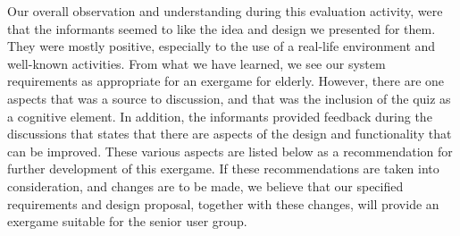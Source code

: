 Our overall observation and understanding during this evaluation activity, were that the informants seemed to like the idea and design we presented for them. They were mostly positive, especially to the use of a real-life environment and well-known activities. From what we have learned, we see our system requirements as appropriate for an exergame for elderly. However, there are one aspects that was a source to discussion, and that was the inclusion of the quiz as a cognitive element. In addition, the informants provided feedback during the discussions that states that there are aspects of the design and functionality that can be improved. These various aspects are listed below as a recommendation for further development of this exergame. If these recommendations are taken into consideration, and changes are to be made, we believe that our specified requirements and design proposal, together with these changes, will provide an exergame suitable for the senior user group.  

